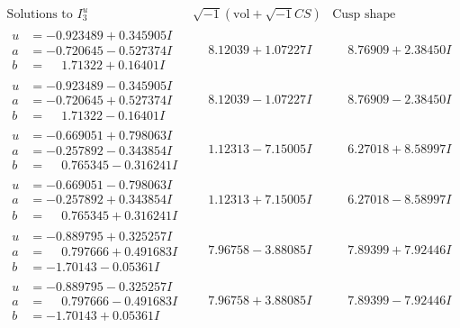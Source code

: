 \documentclass[1p]{elsarticle_modified}
\theoremstyle{definition}
\newcommand{\I}{\sqrt{-1}}
\begin{document}
$$\begin{array}{c|c|c}  
\text{Solutions to }I^u_{3}& \I (\text{vol} + \sqrt{-1}CS) & \text{Cusp shape}\\
 \hline 
\begin{aligned}
u &= -0.923489 + 0.345905 I \\
a &= -0.720645 - 0.527374 I \\
b &= \phantom{-}1.71322 + 0.16401 I\end{aligned}
 & \phantom{-}8.12039 + 1.07227 I & \phantom{-}8.76909 + 2.38450 I \\ \hline\begin{aligned}
u &= -0.923489 - 0.345905 I \\
a &= -0.720645 + 0.527374 I \\
b &= \phantom{-}1.71322 - 0.16401 I\end{aligned}
 & \phantom{-}8.12039 - 1.07227 I & \phantom{-}8.76909 - 2.38450 I \\ \hline\begin{aligned}
u &= -0.669051 + 0.798063 I \\
a &= -0.257892 - 0.343854 I \\
b &= \phantom{-}0.765345 - 0.316241 I\end{aligned}
 & \phantom{-}1.12313 - 7.15005 I & \phantom{-}6.27018 + 8.58997 I \\ \hline\begin{aligned}
u &= -0.669051 - 0.798063 I \\
a &= -0.257892 + 0.343854 I \\
b &= \phantom{-}0.765345 + 0.316241 I\end{aligned}
 & \phantom{-}1.12313 + 7.15005 I & \phantom{-}6.27018 - 8.58997 I \\ \hline\begin{aligned}
u &= -0.889795 + 0.325257 I \\
a &= \phantom{-}0.797666 + 0.491683 I \\
b &= -1.70143 - 0.05361 I\end{aligned}
 & \phantom{-}7.96758 - 3.88085 I & \phantom{-}7.89399 + 7.92446 I \\ \hline\begin{aligned}
u &= -0.889795 - 0.325257 I \\
a &= \phantom{-}0.797666 - 0.491683 I \\
b &= -1.70143 + 0.05361 I\end{aligned}
 & \phantom{-}7.96758 + 3.88085 I & \phantom{-}7.89399 - 7.92446 I \\ \hline\begin{aligned}

\end{aligned}
\end{array}$$
\end{document}
